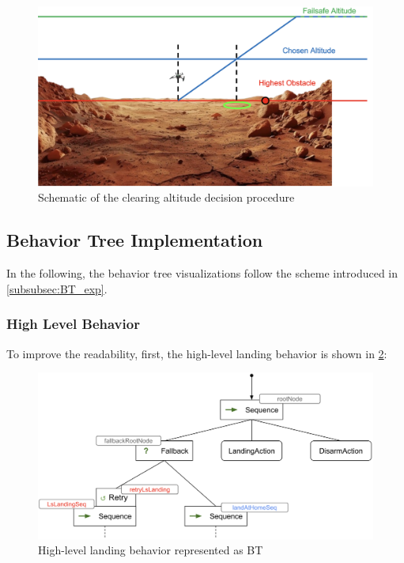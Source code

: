    \begin{figure}[h]
    \centering
    \includegraphics[scale=0.2]{images/autonomous_landing/clearing_altitude.png}
    \caption{Schematic of the clearing altitude decision procedure}
    \label{fig:clear_alt}
    \end{figure}

\subsection{Behavior Tree Implementation}\label{subsec:behavior_tree}

In the following, the behavior tree visualizations follow the scheme introduced in \cref{subsubsec:BT_exp}.

\subsubsection{High Level Behavior}

To improve the readability, first, the high-level landing behavior is shown in \cref{fig:high_lvl_bt}:

\begin{figure}[h]
\centering
\includegraphics[scale=0.18]{images/autonomous_landing/high_level_BT.png}
\caption{High-level landing behavior represented as BT}
\label{fig:high_lvl_bt}
\end{figure}

